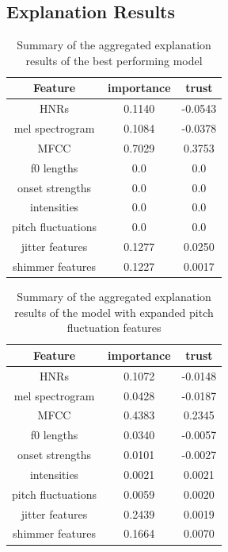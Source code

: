 \documentclass{article}
\begin{document}
		\subsection{Explanation Results}
		\begin{table}[htbp]
			\centering
			\begin{tabular}{c | c | c}
				Feature & importance & trust \\
				\hline
				HNRs & 0.1140 & -0.0543 \\
				mel spectrogram & 0.1084 & -0.0378 \\
				MFCC & 0.7029 & 0.3753 \\
				f0 lengths & 0.0 & 0.0 \\
				onset strengths & 0.0 & 0.0 \\
				intensities & 0.0 & 0.0 \\
				pitch fluctuations & 0.0 & 0.0 \\
				jitter features & 0.1277 & 0.0250 \\
				shimmer features & 0.1227 & 0.0017
			\end{tabular}
			\caption{Summary of the aggregated explanation results of the best performing model}
			\label{table:exp-results-cterm}
		\end{table}
		\begin{table}[htbp]
			\centering
			\begin{tabular}{c | c | c}
				Feature & importance & trust \\
				\hline
				HNRs & 0.1072 & -0.0148 \\
				mel spectrogram & 0.0428 & -0.0187 \\
				MFCC & 0.4383 & 0.2345 \\
				f0 lengths & 0.0340 & -0.0057 \\
				onset strengths & 0.0101 & -0.0027 \\
				intensities & 0.0021 & 0.0021 \\
				pitch fluctuations & 0.0059 & 0.0020 \\
				jitter features & 0.2439 & 0.0019 \\
				shimmer features & 0.1664 & 0.0070
			\end{tabular}
			\caption{Summary of the aggregated explanation results of the model with expanded
			pitch fluctuation features}
			\label{table:exp-results-more-pitch-flucs}
		\end{table}
\end{document}
